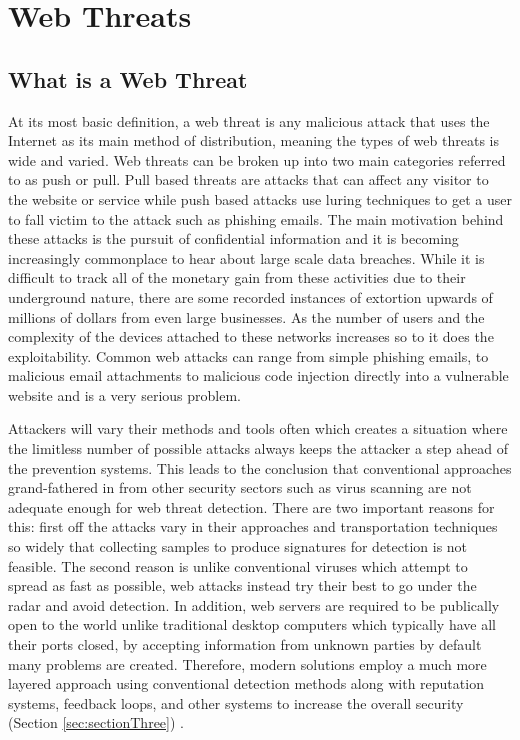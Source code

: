 \chapter{Web Threats} \label{sec:sectionTwo}
\section{What is a Web Threat}

At its most basic definition, a web threat is any malicious attack that uses the Internet as its main method of distribution, meaning the types of web threats is wide and varied.  Web threats can be broken up into two main categories referred to as push or pull.  Pull based threats are attacks that can affect any visitor to the website or service while push based attacks use luring techniques to get a user to fall victim to the attack such as phishing emails.  The main motivation behind these attacks is the pursuit of confidential information and it is becoming increasingly commonplace to hear about large scale data breaches.  While it is difficult to track all of the monetary gain from these activities due to their underground nature, there are some recorded instances of extortion upwards of millions of dollars from even large businesses.  As the number of users and the complexity of the devices attached to these networks increases so to it does the exploitability.  Common web attacks can range from simple phishing emails, to malicious email attachments to malicious code injection directly into a vulnerable website and is a very serious problem.

Attackers will vary their methods and tools often which creates a situation where the limitless number of possible attacks always keeps the attacker a step ahead of the prevention systems.  This leads to the conclusion that conventional approaches grand-fathered in from other security sectors such as virus scanning are not adequate enough for web threat detection.  There are two important reasons for this: first off the attacks vary in their approaches and transportation techniques so widely that collecting samples to produce signatures for detection is not feasible.  The second reason is unlike conventional viruses which attempt to spread as fast as possible, web attacks instead try their best to go under the radar and avoid detection.  In addition, web servers are required to be publically open to the world unlike traditional desktop computers which typically have all their ports closed, by accepting information from unknown parties by default many problems are created.  Therefore, modern solutions employ a much more layered approach using conventional detection methods along with reputation systems, feedback loops, and other systems to increase the overall security (Section \ref{sec:sectionThree}) \cite{trendMicro}.

